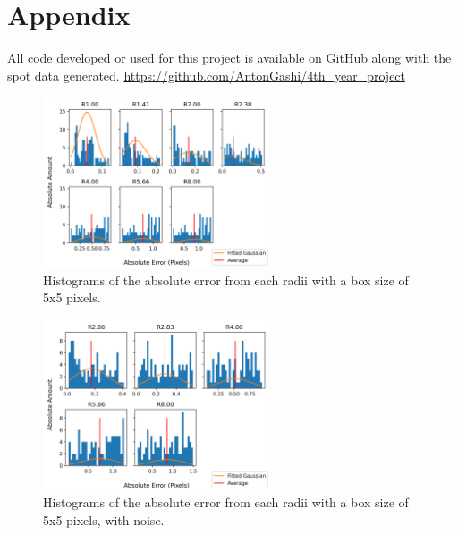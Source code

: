 \documentclass[aps,pra,a4paper,nofootinbib,onecolumn,tightenlines,longbibliography,12pt,amsfonts,amssymb,amsmath,floatfix]{revtex4-2} %
\begin{document}



\newpage


\newpage
\appendix

\section{Appendix}
\label{sec:appendix}

  All code developed or used for this project is available on GitHub along with the spot data generated.
  \url{https://github.com/AntonGashi/4th_year_project}

  \begin{figure}[H]
    \begin{center}
      \includegraphics[width=0.6\textwidth]{project_pics/distro_centriod_5.png}
    \end{center}
    \caption{Histograms of the absolute error from each radii with a box size of 5x5 pixels.}
    \label{fig:box_5}
  \end{figure}

  \begin{figure}[H]
    \begin{center}
      \includegraphics[width=0.6\textwidth]{project_pics/noise_cen_scatter_5.png}
    \end{center}
    \caption{Histograms of the absolute error from each radii with a box size of 5x5 pixels, with noise.}
    \label{fig:box_5_noise}
  \end{figure}
\end{document}
